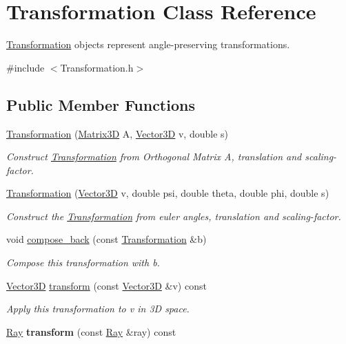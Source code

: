 \hypertarget{classTransformation}{}\section{Transformation Class Reference}
\label{classTransformation}


\hyperlink{classTransformation}{Transformation} objects represent angle-\/preserving transformations.  




{\ttfamily \#include $<$Transformation.\+h$>$}

\subsection*{Public Member Functions}
\begin{DoxyCompactItemize}
\item 
\hyperlink{classTransformation_ae3e048a4a35f5f0acf55d8bf5fe8e3e5}{Transformation} (\hyperlink{classMatrix3D}{Matrix3D} A, \hyperlink{classVector3D}{Vector3D} v, double s)
\begin{DoxyCompactList}\small\item\em Construct \hyperlink{classTransformation}{Transformation} from Orthogonal Matrix A, translation and scaling-\/factor. \end{DoxyCompactList}\item 
\hyperlink{classTransformation_a2dec7609284e83c0e9c95775d980e2e9}{Transformation} (\hyperlink{classVector3D}{Vector3D} v, double psi, double theta, double phi, double s)
\begin{DoxyCompactList}\small\item\em Construct the \hyperlink{classTransformation}{Transformation} from euler angles, translation and scaling-\/factor. \end{DoxyCompactList}\item 
void \hyperlink{classTransformation_aca9cdb9c2382334ee62b53903b1b5738}{compose\+\_\+back} (const \hyperlink{classTransformation}{Transformation} \&b)
\begin{DoxyCompactList}\small\item\em Compose this transformation with b. \end{DoxyCompactList}\item 
\hyperlink{classVector3D}{Vector3D} \hyperlink{classTransformation_aff15bea6054cd51532839fe8c92b39b9}{transform} (const \hyperlink{classVector3D}{Vector3D} \&v) const 
\begin{DoxyCompactList}\small\item\em Apply this transformation to v in 3D space. \end{DoxyCompactList}\item 
\hyperlink{classRay}{Ray} {\bfseries transform} (const \hyperlink{classRay}{Ray} \&ray) const \hypertarget{classTransformation_a6ecf5c3802accfe965fb5989a5be80b7}{}\label{classTransformation_a6ecf5c3802accfe965fb5989a5be80b7}


\end{DoxyCompactItemize}
